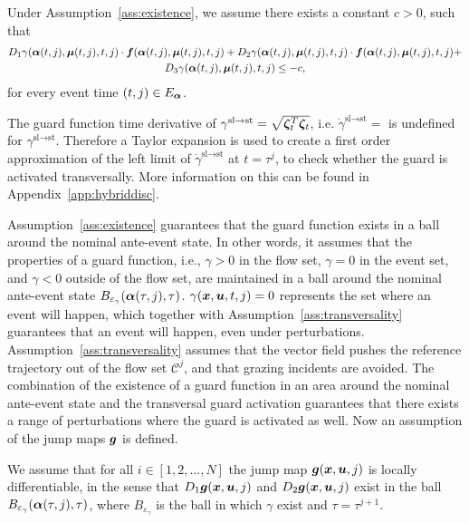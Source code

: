 \documentclass[../DC2017114Bouma.tex]{subfiles}
\begin{document}
\begin{myass}\label{ass:transversality}
Under Assumption~\ref{ass:existence}, we assume there exists a constant $c>0$, such that
\begin{multline}
D_1\gamma(\boldsymbol{\alpha}(t,j),\boldsymbol{\mu}(t,j),t,j)\cdot{\boldsymbol{f}}(\boldsymbol{\alpha}(t,j),\boldsymbol{\mu}(t,j),t,j) + D_2\gamma(\boldsymbol{\alpha}(t,j),\boldsymbol{\mu}(t,j),t,j)\cdot{\boldsymbol{f}}(\boldsymbol{\alpha}(t,j),\boldsymbol{\mu}(t,j),t,j) +\\ D_3\gamma(\boldsymbol{\alpha}(t,j),\boldsymbol{\mu}(t,j),t,j) \leq -c,
\end{multline}
for every event time $(t,j) \in E_{\boldsymbol{\alpha}}$.
\end{myass}

\begin{myremark}
The guard function time derivative of $\gamma^{\text{sl}\rightarrow\text{st}} = \sqrt{\boldsymbol{\zeta}_t^T\boldsymbol{\zeta}_t}$, i.e. $\dot{\gamma}^{\text{sl}\rightarrow\text{st}} = $ is undefined for $\gamma^{\text{sl}\rightarrow\text{st}}$. Therefore a Taylor expansion is used to create a first order approximation of the left limit of $\dot{\gamma}^{\text{sl}\rightarrow\text{st}}$ at $t = \tau^j$, to check whether the guard is activated transversally. More information on this can be found in Appendix~\ref{app:hybriddisc}. 
\end{myremark}

Assumption~\ref{ass:existence} guarantees that the guard function exists in a ball around the nominal ante-event state. In other words, it assumes that the properties of a guard function, i.e., $\gamma>0$ in the flow set, $\gamma=0$ in the event set, and $\gamma<0$ outside of the flow set, are maintained in a ball around the nominal ante-event state $B_{\varepsilon_\gamma}(\boldsymbol{\alpha}(\tau,j),\tau)$.  $\gamma({\boldsymbol{x}},{\boldsymbol{u}},t,j) = 0$ represents the set where an event will happen, which together with Assumption~\ref{ass:transversality} guarantees that an event will happen, even under perturbations. Assumption~\ref{ass:transversality} assumes that the vector field pushes the reference trajectory out of the flow set $\mathcal{C}^j$, and that grazing incidents are avoided. The combination of the existence of a guard function in an area around the nominal ante-event state and the transversal guard activation guarantees that there exists a range of perturbations where the guard is activated as well. Now an assumption of the jump maps ${\boldsymbol{g}}$ is defined.

\begin{myass}\label{ass:jump}
We assume that for all $i \in [1,2,...,N]$ the jump map ${\boldsymbol{g}}({\boldsymbol{x}},{\boldsymbol{u}},j)$ is locally differentiable, in the sense that $D_1{\boldsymbol{g}}({\boldsymbol{x}},{\boldsymbol{u}},j)$ and $D_2{\boldsymbol{g}}({\boldsymbol{x}},{\boldsymbol{u}},j)$ exist in the ball $B_{\varepsilon_{\gamma}}(\boldsymbol{\alpha}(\tau,j),\tau)$, where $B_{\varepsilon_{\gamma}}$ is the ball in which $\gamma$ exist and $\tau = \tau^{j+1}$.
\end{myass}
\end{document}
